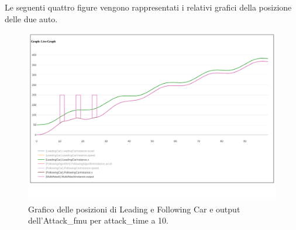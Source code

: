 Le seguenti quattro figure vengono rappresentati i relativi grafici della posizione delle due auto.
\begin{figure}[H]
	\centering
	\includegraphics[width=\textwidth]{img/MultiAttackXT10.png}
	\caption{Grafico delle posizioni di Leading e Following Car e output dell'Attack\_fmu per attack\_time a 10.}
\end{figure}
